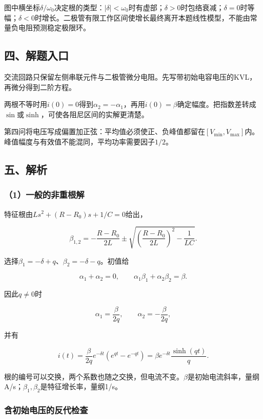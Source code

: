 \documentclass[12pt,a4paper,fontset=fandol]{ctexart}
\begin{document}
图中横坐标\(\delta/\omega_0\)决定根的类型：\(|\delta|<\omega_0\)时有虚部；\(\delta>0\)时包络衰减；\(\delta=0\)时等幅；\(\delta<0\)时增长。二极管有限工作区间使增长最终离开本题线性模型，不能由常量负电阻预测稳定极限环。

\subsection{四、解题入口}\label{ux56dbux89e3ux9898ux5165ux53e3-2}

交流回路只保留左侧串联元件与二极管微分电阻。先写带初始电容电压的KVL，再微分得到二阶方程。

两根不等时用\(i(0)=0\)得到\(\alpha_2=-\alpha_1\)，再用\(\dot i(0)=\beta\)确定幅度。把指数差转成\(\sin\)或\(\sinh\)，可使各阻尼区间的实解更清楚。

第四问将电压写成偏置加正弦：平均值必须使正、负峰值都留在\([V_{\min},V_{\max}]\)内。峰值幅度与有效值不能混同，平均功率需要因子\(1/2\)。

\subsection{五、解析}\label{ux4e94ux89e3ux6790-2}

\subsubsection{（1）一般的非重根解}\label{ux4e00ux822cux7684ux975eux91cdux6839ux89e3}

特征根由\(Ls^2+(R-R_0)s+1/C=0\)给出，

\[
\boxed{
\beta_{1,2}
=-\frac{R-R_0}{2L}
\pm\sqrt{\left(\frac{R-R_0}{2L}\right)^2-\frac1{LC}}}.
\]

选择\(\beta_1=-\delta+q\)、\(\beta_2=-\delta-q\)。初值给

\[
\alpha_1+\alpha_2=0,
\qquad
\alpha_1\beta_1+\alpha_2\beta_2=\beta.
\]

因此\(q\neq0\)时

\[
\boxed{\alpha_1=\frac{\beta}{2q},\qquad
\alpha_2=-\frac{\beta}{2q}},
\]

并有

\[
\boxed{
i(t)=\frac{\beta}{2q}e^{-\delta t}
(e^{qt}-e^{-qt})
=\beta e^{-\delta t}\frac{\sinh(qt)}q}.
\]

根的编号可以交换，两个系数也随之交换，但电流不变。\(\beta\)是初始电流斜率，量纲A/s；\(\beta_1,\beta_2\)是特征增长率，量纲1/s。

\subsubsection{含初始电压的反代检查}\label{ux542bux521dux59cbux7535ux538bux7684ux53cdux4ee3ux68c0ux67e5}
\end{document}
